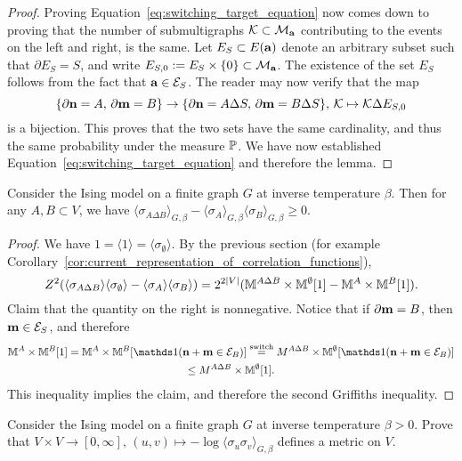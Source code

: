 \begin{proof}
    Proving Equation~\eqref{eq:switching_target_equation} now comes down to
    proving that the number of submultigraphs $\calK\subset\calM_\a$ contributing
    to the events on the left and right, is the same.
    Let $E_S\subset E(\a)$ denote an arbitrary subset such that $\partial E_S=S$,
    and write $E_{S,0}:=E_S\times\{0\}\subset\calM_\a$.
    The existence of the set $E_S$ follows from the fact that $\a\in\calE_S$.
    The reader may now verify that the map
    \[
        \{\partial\n=A,\,\partial\m=B\}
        \to
        \{\partial\n=A\Delta S,\,\partial\m=B\Delta S\}
        ,\,
        \calK\mapsto \calK\Delta E_{S,0}
    \]
    is a bijection.
    This proves that the two sets have the same cardinality,
    and thus the same probability under the measure $\P$.
    We have now established Equation~\eqref{eq:switching_target_equation}
    and therefore the lemma.
\end{proof}

\begin{corollary}
    Consider the Ising model on a finite graph $G$ at inverse temperature $\beta$.
    Then for any $A,B\subset V$, we have
    $\langle\sigma_{A\Delta B}\rangle_{G,\beta}-\langle\sigma_A\rangle_{G,\beta}\langle\sigma_B\rangle_{G,\beta}\geq 0$.
\end{corollary}

\begin{proof}
    We have $1=\langle1\rangle=\langle\sigma_\emptyset\rangle$.
    By the previous section (for example Corollary~\ref{cor:current_representation_of_correlation_functions}),
    \[
    Z^2
    (\langle\sigma_{A\Delta B}\rangle\langle\sigma_\emptyset\rangle-\langle\sigma_A\rangle\langle\sigma_B\rangle)
    =
    2^{2|V|}
    (
    \M^{A\Delta B}\times\M^\emptyset[1]
    -
    \M^A\times\M^B[1]
    ).
    \]
    Claim that the quantity on the right is nonnegative.
    Notice that if $\partial\m= B$, then $\m\in\calE_S$,
    and therefore
    \begin{multline}
        \M^A\times\M^B[1]
        =
        \M^A\times\M^B[\true{\n+\m\in\calE_B}]
        \stackrel{\text{switch}}=
        M^{A\Delta B}\times\M^\emptyset[\true{\n+\m\in\calE_B}]
        \\
        \leq
        M^{A\Delta B}\times\M^\emptyset[1].
    \end{multline}
    This inequality implies the claim, and therefore the second Griffiths inequality.
\end{proof}

\begin{exercise}
    Consider the Ising model on a finite graph $G$
    at inverse temperature $\beta>0$.
    Prove that $V\times V\to [0,\infty],\,
    (u,v)\mapsto-\log\langle\sigma_u\sigma_v\rangle_{G,\beta}$
    defines a metric on $V$.
\end{exercise}

